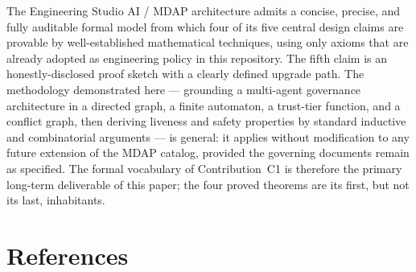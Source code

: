 \documentclass[12pt]{article}
\theoremstyle{definition}
\begin{document}
The Engineering Studio AI / MDAP architecture admits a concise,
precise, and fully auditable formal model from which four of its five
central design claims are provable by well-established mathematical
techniques, using only axioms that are already adopted as engineering
policy in this repository.  The fifth claim is an honestly-disclosed
proof sketch with a clearly defined upgrade path.  The methodology
demonstrated here --- grounding a multi-agent governance architecture
in a directed graph, a finite automaton, a trust-tier function, and a
conflict graph, then deriving liveness and safety properties by
standard inductive and combinatorial arguments --- is general: it
applies without modification to any future extension of the MDAP
catalog, provided the governing documents remain as specified.  The
formal vocabulary of Contribution~C1 is therefore the primary
long-term deliverable of this paper; the four proved theorems are its
first, but not its last, inhabitants.



\newpage
\section*{References}
\label{sec:references}
\end{document}
